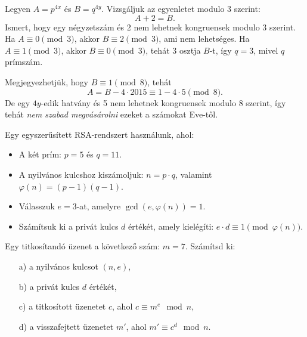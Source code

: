 \begin{solution}
Legyen $A=p^{4x}$ és $B=q^{4y}$. Vizsgáljuk az egyenletet modulo
3 szerint: 
\[
A+2=B.
\]
Ismert, hogy egy négyzetszám és 2 nem lehetnek kongruensek modulo
3 szerint. Ha $A\equiv0\pmod 3$, akkor $B\equiv2\pmod 3$, ami nem
lehetséges. Ha $A\equiv1\pmod 3$, akkor $B\equiv0\pmod 3$, tehát
3 osztja $B$-t, így $q=3$, mivel $q$ prímszám.

Megjegyezhetjük, hogy $B\equiv1\pmod 8$, tehát 
\[
A=B-4\cdot2015\equiv1-4\cdot5\pmod 8.
\]
De egy $4y$-edik hatvány és 5 nem lehetnek kongruensek modulo 8 szerint,
így tehát \emph{nem szabad megvásárolni} ezeket a számokat Eve-től. 
\end{solution}
\begin{extraproblem}
Egy egyszerűsített RSA-rendszert használunk, ahol:
\begin{itemize}
\item A két prím: $p=5$ és $q=11$. 
\item A nyilvános kulcshoz kiszámoljuk: $n=p\cdot q$, valamint $\varphi(n)=(p-1)(q-1)$. 
\item Válasszuk $e=3$-at, amelyre $\gcd(e,\varphi(n))=1$. 
\item Számítsuk ki a privát kulcs $d$ értékét, amely kielégíti: $e\cdot d\equiv1\pmod{\varphi(n)}$. 
\end{itemize}
Egy titkosítandó üzenet a következő szám: $m=7$. Számítsd ki:
\begin{enumerate}
\item[a)] a nyilvános kulcsot $(n,e)$, 
\item[b)] a privát kulcs $d$ értékét, 
\item[c)] a titkosított üzenetet $c$, ahol $c\equiv m^{e}\mod n$, 
\item[d)] a visszafejtett üzenetet $m'$, ahol $m'\equiv c^{d}\mod n$. 
\end{enumerate}
\end{extraproblem}

